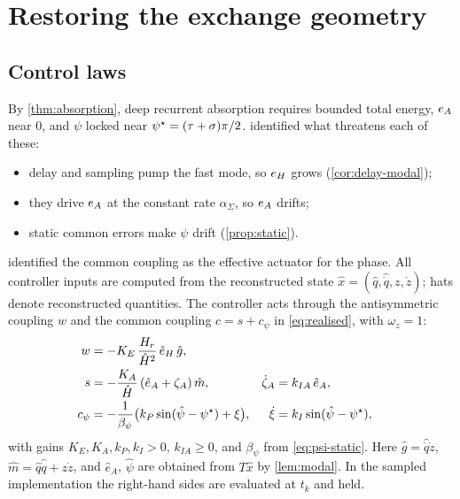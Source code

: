 \section{Restoring the exchange geometry}\label{sec:control}

\subsection{Control laws}
By \cref{thm:absorption}, deep recurrent absorption requires bounded total
energy, $e_A$ near $0$, and $\psi$ locked near $\psi^\star=(\tau+\sigma)\pi/2$.
 identified what threatens each of these:
\begin{itemize}
\item delay and sampling pump the fast mode, so $e_H$ grows (\cref{cor:delay-modal});
\item they drive $e_A$ at the constant rate $\alpha_\Sigma$, so $e_A$ drifts;
\item static common errors make $\psi$ drift (\cref{prop:static}).
\end{itemize}
 identified the common coupling as the effective actuator
for the phase.
All controller inputs are computed from the reconstructed state
$\hat x=(\hat q,\hat{\dot q},z,\dot z)$; hats denote reconstructed quantities.
The controller acts through the antisymmetric coupling $w$ and the common coupling
$c=s+c_\psi$ in \eqref{eq:realised}, with $\omega_z=1$:
\begin{subequations}\label{eq:control}
\begin{align}
  w&=-K_E\,\frac{H_r}{\hat H^2}\,\hat e_H\,\hat g, \label{eq:u}\\
  s&=-\frac{K_A}{\hat H}\,(\hat e_A+\zeta_A)\,\hat m,
  &\dot\zeta_A&=k_{IA}\,\hat e_A, \label{eq:s}\\
  c_\psi&=-\frac{1}{\beta_\psi}\big(k_P\sin(\hat\psi-\psi^\star)+\xi\big),
  &\dot\xi&=k_I\sin(\hat\psi-\psi^\star), \label{eq:cpsi}
\end{align}
\end{subequations}
with gains $K_E,K_A,k_P,k_I>0$, $k_{IA}\ge0$, and $\beta_\psi$ from
\eqref{eq:psi-static}.
Here $\hat g=\hat{\dot q}\dot z$, $\hat m=\hat q\hat{\dot q}+z\dot z$, and $\hat
e_A$, $\hat\psi$ are obtained from $T\hat x$ by \cref{lem:modal}.
In the sampled implementation the right-hand sides are evaluated at $t_k$ and
held.

